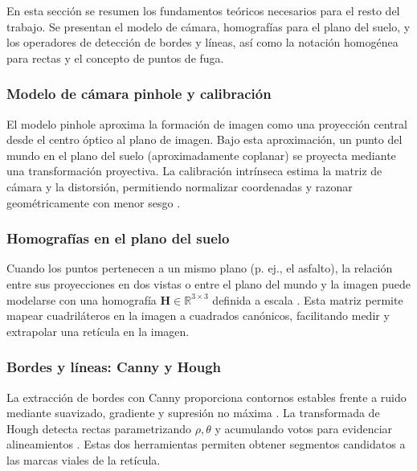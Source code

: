\noindent
En esta sección se resumen los fundamentos teóricos necesarios para el resto del trabajo. Se presentan el modelo de cámara, homografías para el plano del suelo, y los operadores de detección de bordes y líneas, así como la notación homogénea para rectas y el concepto de puntos de fuga.

\subsubsection{Modelo de cámara pinhole y calibración}\label{subsec:camera}
\noindent
El modelo pinhole aproxima la formación de imagen como una proyección central desde el centro óptico al plano de imagen. Bajo esta aproximación, un punto del mundo en el plano del suelo (aproximadamente coplanar) se proyecta mediante una transformación proyectiva. La calibración intrínseca estima la matriz de cámara y la distorsión, permitiendo normalizar coordenadas y razonar geométricamente con menor sesgo \cite{hartley2003multiple}.

\subsubsection{Homografías en el plano del suelo}\label{subsec:homografias}
\noindent
Cuando los puntos pertenecen a un mismo plano (p. ej., el asfalto),
la relación entre sus proyecciones en dos vistas o entre el plano del mundo
y la imagen puede modelarse con una homografía
\(\mathbf{H}\in\mathbb{R}^{3\times3}\)
definida a escala \cite{hartley2003multiple}.
Esta matriz permite mapear cuadriláteros en la imagen a cuadrados canónicos,
facilitando medir y extrapolar una retícula en la imagen.

\subsubsection{Bordes y líneas: Canny y Hough}\label{sec:canny-hough}
\noindent
La extracción de bordes con Canny proporciona contornos estables frente a ruido mediante suavizado, gradiente y supresión no máxima \cite{canny1986edge}. La transformada de Hough detecta rectas parametrizando \(\rho,\theta\) y acumulando votos para evidenciar alineamientos \cite{ballard1981hough}. Estas dos herramientas permiten obtener segmentos candidatos a las marcas viales de la retícula.

